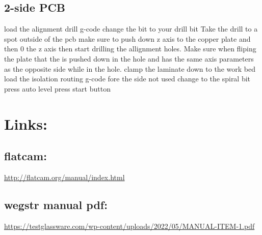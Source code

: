 \documentclass[12pt]{article}
\begin{document}
\subsection{2-side PCB}
load the alignment drill  g-code
change the bit to your drill bit 
Take the drill to a spot outside of the pcb make sure to push down z axis to the copper plate and then 0 the z axis
 then start drilling the allignment holes. Make sure when fliping the plate that the is pushed down in the hole and
 has the same axis parameters as the opposite side while in the hole.
clamp the laminate down to the work bed 
load the isolation routing g-code fore the side not used  
change to the spiral bit 
press auto level 
press start button 
\newpage


\section{Links:}

\subsection{flatcam:}

\url{http://flatcam.org/manual/index.html}

\subsection{wegstr manual pdf:}

\url{https://testglassware.com/wp-content/uploads/2022/05/MANUAL-ITEM-1.pdf}

\newpage

\end{document}

